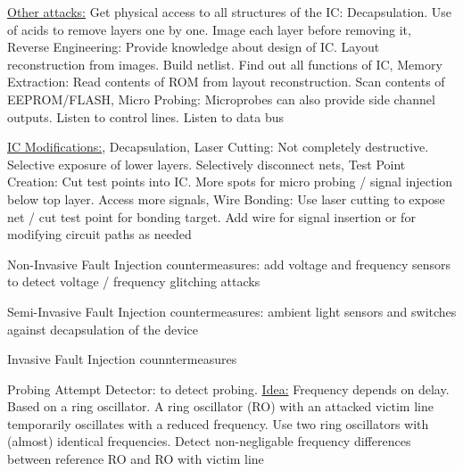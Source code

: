 \documentclass[landscape, a4paper]{article}
\begin{document}
\begin{minipage}[t]{0.2\linewidth}
	\begin{betterlist}
		\item \underline{Other attacks:} \alert{Get physical access to all structures of the IC:} Decapsulation. Use of acids to remove layers one by one. Image each layer before removing it, \alert{Reverse Engineering:} Provide knowledge about design of IC. Layout reconstruction from images. Build netlist. Find out all functions of IC, \alert{Memory Extraction:} Read contents of ROM from layout reconstruction. Scan contents of EEPROM/FLASH, \alert{Micro Probing:} Microprobes can also provide side channel outputs. Listen to control lines. Listen to data bus
		\item \underline{IC Modifications:}, \alert{Decapsulation}, \alert{Laser Cutting:} Not completely destructive. Selective exposure of lower layers. Selectively disconnect nets, \alert{Test Point Creation:} Cut test points into IC. More spots for micro probing / signal injection below top layer. Access more signals, \alert{Wire Bonding:} Use laser cutting to expose net / cut test point for bonding target. Add wire for signal insertion or for modifying circuit paths as needed
	\end{betterlist}
	\begin{betterlist}
		\item \alert{Non-Invasive Fault Injection countermeasures:} add voltage and frequency sensors to detect voltage / frequency glitching attacks
		\item \alert{Semi-Invasive Fault Injection countermeasures:} ambient light sensors and switches against decapsulation of the device
		\item \alert{Invasive Fault Injection counntermeasures}
		\begin{betterlist}
			\item \alert{Probing Attempt Detector:} to detect probing. \underline{Idea:} Frequency depends on delay. Based on a ring oscillator. A ring oscillator (RO) with an attacked victim line temporarily oscillates with a reduced frequency. Use two ring oscillators with (almost) identical frequencies. Detect non-negligable frequency differences between reference RO and RO with victim line


\end{betterlist}
\end{betterlist}
\end{minipage}
\end{document}
